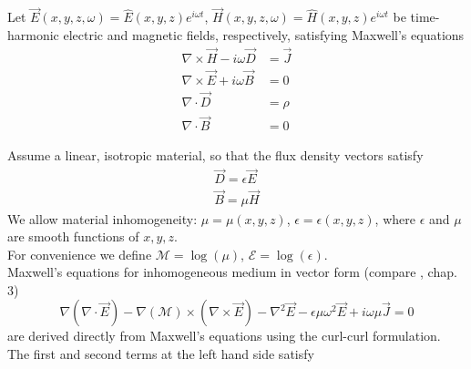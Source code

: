 \documentclass[twocolumn,secnumarabic,amssymb, nobibnotes, aps, prd]{revtex4-1}
\begin{document}
Let $\overrightarrow{E}(x,y,z,\omega) = \hat{E}(x,y,z)e^{i \omega t}$, $\overrightarrow{H}(x,y,z,\omega) = \hat{H}(x,y,z)e^{i \omega t}$ be time-harmonic electric and magnetic fields, respectively, satisfying Maxwell's equations
\begin{subequations}

	\begin{align}
        \nabla \times \overrightarrow{H}-i \omega \overrightarrow{D} &= \overrightarrow{J}  \label{eqns:CurlH_Maxwell}	\\	
        \nabla \times \overrightarrow{E} + i \omega \overrightarrow{B} &= 0  \label{eqns:CurlE_Maxwell} \\
		\nabla \cdot \overrightarrow{D} &=  \rho	 \label{eqns:DivD_Maxwell}\\		
		\nabla \cdot \overrightarrow{B} &= 0	
	\end{align}
\end{subequations}
 
Assume a linear, isotropic material, so that the flux density vectors satisfy
\begin{subequations}
\begin{align}
        \overrightarrow{D} = \epsilon \overrightarrow{E} \label{eqns:constitutiveDepsE}\\
        \overrightarrow{B} = \mu \overrightarrow{H}	\label{eqns:constitutiveBH}        
\end{align}
\end{subequations}
We allow material inhomogeneity: $\mu=\mu(x,y,z)$, $\epsilon = \epsilon(x,y,z)$, where $\epsilon$ and $\mu$ are smooth functions of $x,y,z$.\\ 
For convenience we define $\mathcal{M} = \log(\mu)$, $\mathcal{E} = \log(\epsilon)$. \\
Maxwell's equations for inhomogeneous medium in vector form (compare \cite{goodman2005introduction}, chap. 3) 
\begin{equation}
\label{eqns:Generalized_wave_vector}
\nabla (\nabla \cdot \overrightarrow{E})-\nabla(\mathcal{M}) \times \left(\nabla \times \overrightarrow{E} \right) - \nabla^2 \overrightarrow{E} -\epsilon \mu \omega^2 \overrightarrow{E} + i \omega \mu \overrightarrow{J} = 0
\end{equation}
are derived directly from Maxwell's equations using the curl-curl formulation. The first and second terms at the left hand side satisfy
\end{document}
